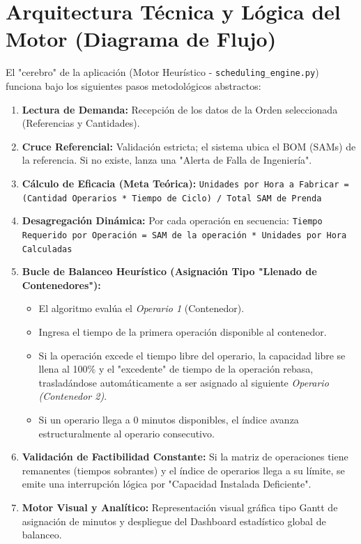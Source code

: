 \documentclass[12pt,a4paper]{article}
\begin{document}
\section{Arquitectura Técnica y Lógica del Motor (Diagrama de Flujo)}

El "cerebro" de la aplicación (Motor Heurístico - \texttt{scheduling\_engine.py}) funciona bajo los siguientes pasos metodológicos abstractos:

\begin{enumerate}
    \item \textbf{Lectura de Demanda:} Recepción de los datos de la Orden seleccionada (Referencias y Cantidades).
    \item \textbf{Cruce Referencial:} Validación estricta; el sistema ubica el BOM (SAMs) de la referencia. Si no existe, lanza una "Alerta de Falla de Ingeniería".
    \item \textbf{Cálculo de Eficacia (Meta Teórica):} \newline \texttt{Unidades por Hora a Fabricar = (Cantidad Operarios * Tiempo de Ciclo) / Total SAM de Prenda}
    \item \textbf{Desagregación Dinámica:} Por cada operación en secuencia: \newline \texttt{Tiempo Requerido por Operación = SAM de la operación * Unidades por Hora Calculadas}
    \item \textbf{Bucle de Balanceo Heurístico (Asignación Tipo "Llenado de Contenedores"):}
    \begin{itemize}
        \item El algoritmo evalúa el \textit{Operario 1} (Contenedor).
        \item Ingresa el tiempo de la primera operación disponible al contenedor.
        \item Si la operación excede el tiempo libre del operario, la capacidad libre se llena al 100\% y el "excedente" de tiempo de la operación rebasa, trasladándose automáticamente a ser asignado al siguiente \textit{Operario (Contenedor 2)}.
        \item Si un operario llega a 0 minutos disponibles, el índice avanza estructuralmente al operario consecutivo.
    \end{itemize}
    \item \textbf{Validación de Factibilidad Constante:} Si la matriz de operaciones tiene remanentes (tiempos sobrantes) y el índice de operarios llega a su límite, se emite una interrupción lógica por "Capacidad Instalada Deficiente".
    \item \textbf{Motor Visual y Analítico:} Representación visual gráfica tipo Gantt de asignación de minutos y despliegue del Dashboard estadístico global de balanceo.
\end{enumerate}
\end{document}
